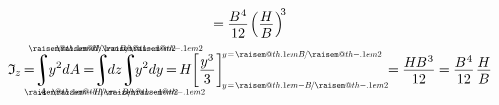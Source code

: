 \documentclass[14pt]{extarticle}
\makeatletter
\newcommand{\raisemath}[1]{\mathpalette{\raisem@th{#1}}}
\newcommand{\raisem@th}[3]{\raisebox{#1}{$#2#3$}}
\DeclareMathOperator*{\integral}{\scalerel*{\rotatebox{12}{$\!\textstyle\int\!$}}{\int}} %
\makeatother
\begin{document}
\[\begin{gathered}
=\hspace{-0.1ex}
\displaystyle\frac{\raisebox{-0.18em}{$B^{\hspace{.1ex}4}$}}{12} \hspace{-.2ex}
\left( \displaystyle\frac{\raisebox{-0.18em}{$H$}}{B} \hspace{.1ex} \right)^{\hspace{-.5ex}3}
\\
\mathfrak{I}_{\hspace{-0.1ex}\scalebox{.8}{$z$}} \hspace{-0.25ex}
=\hspace{-0.6ex}
\integral_{A} \hspace{-0.6ex} y^2 dA \hspace{-0.1ex}
=\hspace{-0.6ex}
\integral_{\mathclap{\hspace{-.3ex} \scalebox{.6}{$ \raisemath{.1em}{-H} \hspace{-.3ex} / \hspace{-.1ex} \raisemath{-.1em}{2} $}}}^{\mathclap{\scalebox{.6}{$ \raisemath{.1em}{H} \hspace{-.3ex} / \hspace{-.1ex} \raisemath{-.1em}{2} $}}} \hspace{-0.7ex} dz \hspace{-.4ex}
\integral_{\mathclap{\hspace{-.3ex} \scalebox{.6}{$ \raisemath{.1em}{-B} \hspace{-.25ex} / \hspace{-.1ex} \raisemath{-.1em}{2} $}}}^{\mathclap{\scalebox{.6}{$ \raisemath{.1em}{B} \hspace{-.25ex} / \hspace{-.1ex} \raisemath{-.1em}{2} $}}} \hspace{-0.7ex} y^2 dy \hspace{-0.2ex}
=\hspace{-0.25ex}
H \hspace{-.5ex} \left[ \displaystyle\frac{\raisebox{-.1em}{$ y^3 $}}{3} \hspace{.1ex} \right]_{\hspace{-.25ex}\scalebox{.6}{$ y \!=\! \raisemath{.1em}{-B} \hspace{-.25ex} / \hspace{-.1ex} \raisemath{-.1em}{2} $}}^{\hspace{-.25ex} \scalebox{.6}{$ y \!=\! \raisemath{.1em}{B} \hspace{-.25ex} / \hspace{-.1ex} \raisemath{-.1em}{2} $}} \hspace{-.8ex}
=\hspace{-0.1ex}
\displaystyle\frac{\raisebox{-0.18em}{$H \hspace{-0.15ex} B^{\hspace{.1ex}3}$}}{12} \hspace{-.1ex}
=\hspace{-0.1ex}
\displaystyle\frac{\raisebox{-0.18em}{$B^{\hspace{.1ex}4}$}}{12} \hspace{.2ex} \displaystyle\frac{\raisebox{-0.18em}{$H$}}{B}
\end{gathered}\]
\end{document}
